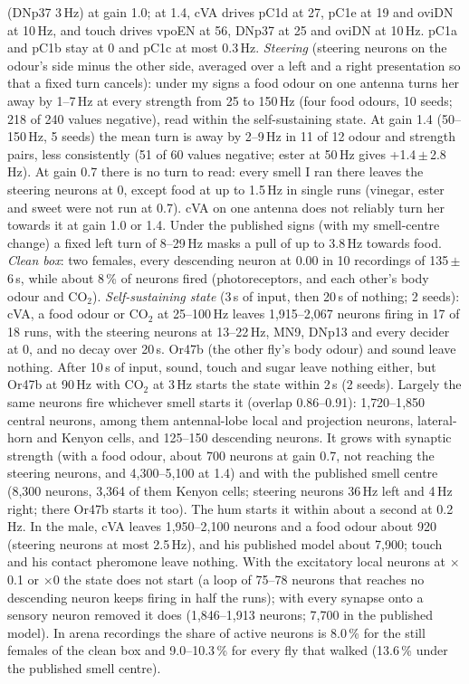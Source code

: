 \begin{enumerate}[leftmargin=*, label=\arabic*., itemsep=4pt]
(DNp37 3\,Hz) at gain 1.0; at 1.4, cVA drives pC1d at 27, pC1e at 19 and oviDN at 10\,Hz, and touch drives vpoEN at 56, DNp37 at 25 and oviDN at 10\,Hz. pC1a and pC1b stay at 0 and pC1c at most 0.3\,Hz.
\emph{Steering} (steering neurons on the odour's side minus the other side, averaged over a left and a right presentation so that a fixed turn cancels): under my signs a food odour on one antenna turns her away by 1--7\,Hz at every strength from 25 to 150\,Hz (four food odours, 10 seeds; 218 of 240 values negative), read within the self-sustaining state. At gain 1.4 (50--150\,Hz, 5 seeds) the mean turn is away by 2--9\,Hz in 11 of 12 odour and strength pairs, less consistently (51 of 60 values negative; ester at 50\,Hz gives +1.4\,$\pm$\,2.8\,Hz). At gain 0.7 there is no turn to read: every smell I ran there leaves the steering neurons at 0, except food at up to 1.5\,Hz in single runs (vinegar, ester and sweet were not run at 0.7). cVA on one antenna does not reliably turn her towards it at gain 1.0 or 1.4. Under the published signs (with my smell-centre change) a fixed left turn of 8--29\,Hz masks a pull of up to 3.8\,Hz towards food. \emph{Clean box}: two females, every descending neuron at 0.00 in 10 recordings of 135\,$\pm$\,6\,s, while about 8\,\% of neurons fired (photoreceptors, and each other's body odour and CO$_2$). \emph{Self-sustaining state} (3\,s of input, then 20\,s of nothing; 2 seeds): cVA, a food odour or CO$_2$ at 25--100\,Hz leaves 1{,}915--2{,}067 neurons firing in 17 of 18 runs, with the steering neurons at 13--22\,Hz, MN9, DNp13 and every decider at 0, and no decay over 20\,s. Or47b (the other fly's body odour) and sound leave nothing. After 10\,s of input, sound, touch and sugar leave nothing either, but Or47b at 90\,Hz with CO$_2$ at 3\,Hz starts the state within 2\,s (2 seeds). Largely the same neurons fire whichever smell starts it (overlap 0.86--0.91): 1{,}720--1{,}850 central neurons, among them antennal-lobe local and projection neurons, lateral-horn and Kenyon cells, and 125--150 descending neurons. It grows with synaptic strength (with a food odour, about 700 neurons at gain 0.7, not reaching the steering neurons, and 4{,}300--5{,}100 at 1.4) and with the published smell centre (8{,}300 neurons, 3{,}364 of them Kenyon cells; steering neurons 36\,Hz left and 4\,Hz right; there Or47b starts it too). The hum starts it within about a second at 0.2\,Hz. In the male, cVA leaves 1{,}950--2{,}100 neurons and a food odour about 920 (steering neurons at most 2.5\,Hz), and his published model about 7{,}900; touch and his contact pheromone leave nothing. With the excitatory local neurons at $\times$0.1 or $\times$0 the state does not start (a loop of 75--78 neurons that reaches no descending neuron keeps firing in half the runs); with every synapse onto a sensory neuron removed it does (1{,}846--1{,}913 neurons; 7{,}700 in the published model).
In arena recordings the share of active neurons is 8.0\,\% for the still females of the clean box and 9.0--10.3\,\% for every fly that walked (13.6\,\% under the published smell centre).


\end{enumerate}
